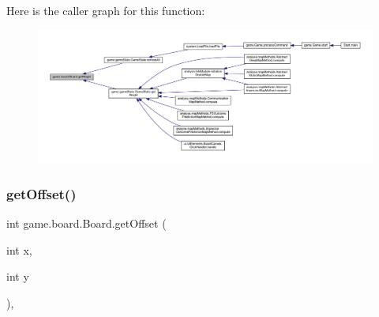 Here is the caller graph for this function\+:
\nopagebreak
\begin{figure}[H]
\begin{center}
\leavevmode
\includegraphics[width=350pt]{classgame_1_1board_1_1_board_a3c3b04d752eee7f25fcf2a57d0675374_icgraph}
\end{center}
\end{figure}
\mbox{\label{classgame_1_1board_1_1_board_a786604a4b98251823436860ea00aec16}} 
\subsubsection{\texorpdfstring{get\+Offset()}{getOffset()}}
{\footnotesize\ttfamily int game.\+board.\+Board.\+get\+Offset (\begin{DoxyParamCaption}\item[{int}]{x,  }\item[{int}]{y }\end{DoxyParamCaption})\hspace{0.3cm}{\ttfamily [inline]}, {\ttfamily [private]}}

